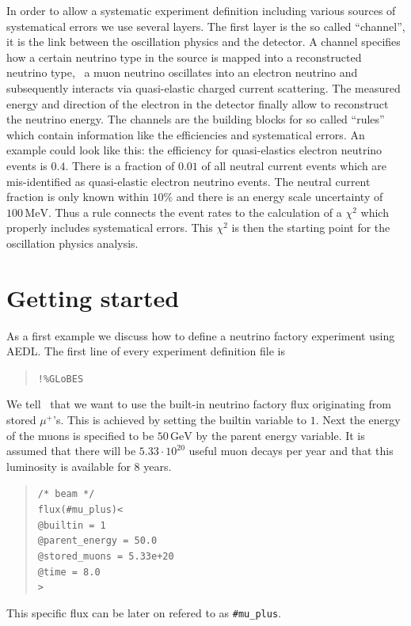 In order to allow a systematic experiment definition including various
sources of systematical errors we use several layers. The first layer is
the so called ``channel'', it is the link between the oscillation physics
and the detector. A channel specifies how a certain neutrino type in the 
source is mapped into a reconstructed neutrino type, \eg\ a muon neutrino
oscillates into an electron neutrino and subsequently interacts via
quasi-elastic charged current scattering. The measured energy and direction of
the electron in the detector finally allow to reconstruct the neutrino energy.
The channels are the building blocks for so called ``rules'' which
contain information like the efficiencies and systematical errors. An example
could look like this: the efficiency for quasi-elastics electron neutrino
events is $0.4$. There is a fraction of $0.01$ of all neutral current events
which are mis-identified as quasi-elastic electron neutrino events. 
The neutral current fraction is only known within $10\%$ and there is
an energy scale uncertainty of $100\,\mathrm{MeV}$. Thus a rule connects the
event rates to the calculation of a $\chi^2$ which properly includes 
systematical errors. This $\chi^2$ is then the starting point for the
oscillation physics analysis.

\chapter{Getting started}

As a first example we discuss how to define a neutrino factory experiment using
AEDL. The first line of every experiment definition file is
\begin{quote}
{\tt !\%GLoBES}
\end{quote}

We tell \GLOBES\ that we want to use the built-in neutrino factory
flux originating from stored $\mu^+$'s. This is achieved by setting 
the builtin variable to $1$.  Next the energy of the muons is specified
to be $50\,\mathrm{GeV}$ by the parent energy variable. It is assumed
that there will be $5.33\cdot 10^{20}$ useful muon decays per year
and that this luminosity is available for $8$ years.
\begin{quote}
{\tt /* beam */}\\
{\tt flux(\#mu\_plus)<\\
\tb  @builtin = 1\\
\tb  @parent\_energy = 50.0\\
\tb  @stored\_muons = 5.33e+20\\
\tb  @time = 8.0\\
>}\\
\end{quote}
This specific flux can be later on refered to as {\tt \#mu\_plus}. 

